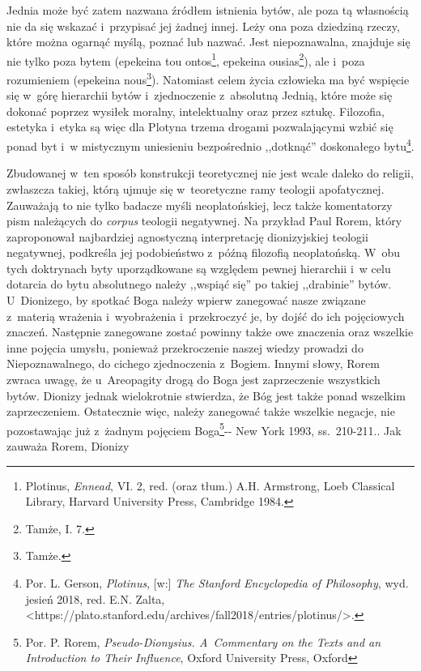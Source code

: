 Jednia może być zatem nazwana źródłem istnienia bytów, ale poza tą własnością nie da się wskazać i~przypisać jej żadnej innej. Leży ona poza dziedziną rzeczy, które można ogarnąć myślą, poznać lub nazwać. Jest niepoznawalna, znajduje się nie tylko poza bytem (epekeina tou ontos\footnote{Plotinus, \textit{Ennead}, VI. 2, red. (oraz tłum.) A.H. Armstrong, Loeb Classical Library, Harvard University Press, Cambridge 1984.}, epekeina ousias\footnote{Tamże, I. 7.}), ale i~poza rozumieniem (epekeina nous\footnote{Tamże.}). Natomiast celem życia człowieka ma być wspięcie się w~górę hierarchii bytów i~zjednoczenie z~absolutną Jednią, które może się dokonać poprzez wysiłek moralny, intelektualny oraz przez sztukę. Filozofia, estetyka i~etyka są więc dla Plotyna trzema drogami pozwalającymi wzbić się ponad byt i~w mistycznym uniesieniu bezpośrednio ,,dotknąć'' doskonałego bytu\footnote{Por. L. Gerson, \textit{Plotinus}, [w:] \textit{The Stanford Encyclopedia of Philosophy}, wyd. jesień 2018, red. E.N. Zalta, {\textless}https://plato.stanford.edu/archives/fall2018/entries/plotinus/{\textgreater}.}.

Zbudowanej w~ten sposób konstrukcji teoretycznej nie jest wcale daleko do religii, zwłaszcza takiej, którą ujmuje się w~teoretyczne ramy teologii apofatycznej. Zauważają to nie tylko badacze myśli neoplatońskiej, lecz także komentatorzy pism należących do \textit{corpus} teologii negatywnej. Na przykład Paul Rorem, który zaproponował najbardziej agnostyczną interpretację dionizyjskiej teologii negatywnej, podkreśla jej podobieństwo z~późną filozofią neoplatońską. W~obu tych doktrynach byty uporządkowane są względem pewnej hierarchii i~w celu dotarcia do bytu absolutnego należy ,,wspiąć się'' po takiej ,,drabinie'' bytów. U~Dionizego, by spotkać Boga należy wpierw zanegować nasze związane z~materią wrażenia i~wyobrażenia i~przekroczyć je, by dojść do ich pojęciowych znaczeń. Następnie zanegowane zostać powinny także owe znaczenia oraz wszelkie inne pojęcia umysłu, ponieważ przekroczenie naszej wiedzy prowadzi do Niepoznawalnego, do cichego zjednoczenia z~Bogiem. Innymi słowy, Rorem zwraca uwagę, że u~Areopagity drogą do Boga jest zaprzeczenie wszystkich bytów. Dionizy jednak wielokrotnie stwierdza, że Bóg jest także ponad wszelkim zaprzeczeniem. Ostatecznie więc, należy zanegować także wszelkie negacje, nie pozostawając już z~żadnym pojęciem Boga\footnote{Por. P. Rorem, \textit{Pseudo-Dionysius. A~Commentary on the Texts and an Introduction to Their Influence}, Oxford University Press, Oxford }-{- New York 1993, ss.~210-211.}. Jak zauważa Rorem, Dionizy

